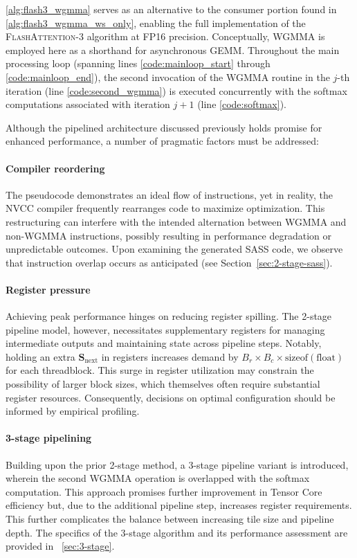 \begin{algorithm}[H]
\begin{algorithmic}[1]
\cref{alg:flash3_wgmma} serves as an alternative to the consumer portion found in \cref{alg:flash3_wgmma_ws_only}, enabling the full implementation of the \textsc{FlashAttention-3} algorithm at FP16 precision. Conceptually, WGMMA is employed here as a shorthand for asynchronous GEMM. Throughout the main processing loop (spanning lines \ref{code:mainloop_start} through \ref{code:mainloop_end}), the second invocation of the WGMMA routine in the $j$-th iteration (line \ref{code:second_wgmma}) is executed concurrently with the softmax computations associated with iteration $j+1$ (line \ref{code:softmax}).

Although the pipelined architecture discussed previously holds promise for enhanced performance, a number of pragmatic factors must be addressed:

\paragraph{Compiler reordering} The pseudocode demonstrates an ideal flow of instructions, yet in reality, the NVCC compiler frequently rearranges code to maximize optimization. This restructuring can interfere with the intended alternation between WGMMA and non-WGMMA instructions, possibly resulting in performance degradation or unpredictable outcomes. Upon examining the generated SASS code, we observe that instruction overlap occurs as anticipated (see Section~\ref{sec:2-stage-sass}).

\paragraph{Register pressure} Achieving peak performance hinges on reducing register spilling. The 2-stage pipeline model, however, necessitates supplementary registers for managing intermediate outputs and maintaining state across pipeline steps. Notably, holding an extra $\mathbf{S}_{\mathrm{next}}$ in registers increases demand by $B_r \times B_c \times \text{sizeof}(\text{float})$ for each threadblock. This surge in register utilization may constrain the possibility of larger block sizes, which themselves often require substantial register resources. Consequently, decisions on optimal configuration should be informed by empirical profiling.

\paragraph{3-stage pipelining} Building upon the prior 2-stage method, a 3-stage pipeline variant is introduced, wherein the second WGMMA operation is overlapped with the softmax computation. This approach promises further improvement in Tensor Core efficiency but, due to the additional pipeline step, increases register requirements. This further complicates the balance between increasing tile size and pipeline depth. The specifics of the 3-stage algorithm and its performance assessment are provided in ~\cref{sec:3-stage}.


\end{algorithmic}
\end{algorithm}
